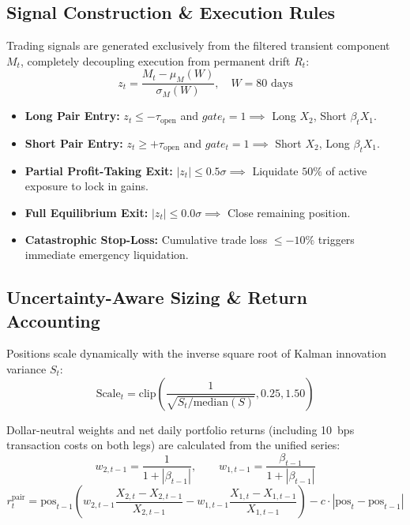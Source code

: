 \documentclass[11pt, a4paper]{article}
\begin{document}
\subsection{Signal Construction \& Execution Rules}
Trading signals are generated exclusively from the filtered transient component $M_t$, completely decoupling execution from permanent drift $R_t$:
\begin{equation}
    z_t = \frac{M_t - \mu_M(W)}{\sigma_M(W)}, \quad W = 80\text{ days}
\end{equation}
\begin{itemize}
    \item \textbf{Long Pair Entry:} $z_t \le -\tau_{\text{open}}$ and $gate_t = 1 \implies$ Long $X_2$, Short $\beta_t X_1$.
    \item \textbf{Short Pair Entry:} $z_t \ge +\tau_{\text{open}}$ and $gate_t = 1 \implies$ Short $X_2$, Long $\beta_t X_1$.
    \item \textbf{Partial Profit-Taking Exit:} $|z_t| \le 0.5\sigma \implies$ Liquidate $50\%$ of active exposure to lock in gains.
    \item \textbf{Full Equilibrium Exit:} $|z_t| \le 0.0\sigma \implies$ Close remaining position.
    \item \textbf{Catastrophic Stop-Loss:} Cumulative trade loss $\le -10\%$ triggers immediate emergency liquidation.
\end{itemize}

\subsection{Uncertainty-Aware Sizing \& Return Accounting}
Positions scale dynamically with the inverse square root of Kalman innovation variance $S_t$:
\begin{equation}
    \text{Scale}_t = \text{clip}\left( \frac{1}{\sqrt{S_t / \text{median}(S)}}, 0.25, 1.50 \right)
\end{equation}

Dollar-neutral weights and net daily portfolio returns (including 10~bps transaction costs on both legs) are calculated from the unified series:
\begin{equation}
    w_{2,t-1} = \frac{1}{1 + |\beta_{t-1}|}, \qquad w_{1,t-1} = \frac{\beta_{t-1}}{1 + |\beta_{t-1}|}
\end{equation}
\begin{equation}
    r_t^{\text{pair}} = \text{pos}_{t-1} \left( w_{2,t-1} \frac{X_{2,t} - X_{2,t-1}}{X_{2,t-1}} - w_{1,t-1} \frac{X_{1,t} - X_{1,t-1}}{X_{1,t-1}} \right) - c \cdot |\text{pos}_t - \text{pos}_{t-1}|
\end{equation}
\end{document}
